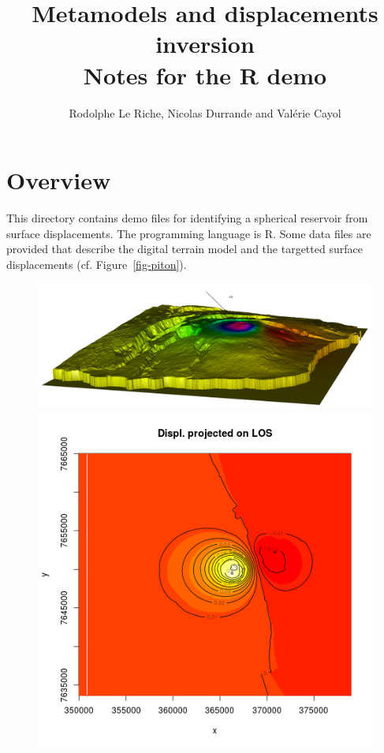 \documentclass[12pt]{article}
\begin{document}
\title{Metamodels and displacements  inversion \\ Notes for the R demo}
\author{Rodolphe Le Riche, Nicolas Durrande and Valérie Cayol}
\maketitle

\section{Overview}
This directory contains demo files for identifying a spherical reservoir from surface displacements. The programming language is R. 
Some data files are provided that describe the digital terrain model and the targetted surface displacements (cf. Figure~\ref{fig-piton}).
\begin{figure}
\begin{center}
\begin{minipage}{0.70\textwidth}
\includegraphics[width=\textwidth]{piton_ulos_2.png}
\end{minipage}
\hspace{0.05cm}
\begin{minipage}{0.44\textwidth}
\includegraphics[width=\textwidth]{contour_ulos.png}

\end{minipage}
\end{center}
\end{figure}
\end{document}
